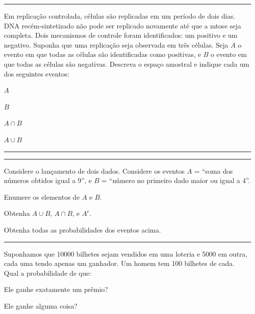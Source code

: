 \documentclass[a4paper,11pt,fleqn]{article}\usepackage[]{graphicx}\usepackage[]{color}
\theoremstyle{definition}
\begin{document}
\begin{compactenum}
\vspace{0.3cm}
\hrule
\vspace{0.3cm}

\item Em replicação controlada, células são replicadas em um período de
  dois dias. DNA recém-sintetizado não pode ser replicado novamente até
  que a mtose seja completa. Dois mecanismos de controle foram
  identificados: um positivo e um negativo. Suponha que uma replicação
  seja observada em três células. Seja $A$ o evento em que todas as
  células são identificadas como positivas, e $B$ o evento em que todas
  as células são negativas. Descreva o espaço amostral e indique cada um
  dos seguintes eventos: \\
  \begin{inparaenum}
  \item $A$ \,
  \item $B$ \,
  \item $A \cap B$ \,
  \item $A \cup B$
  \end{inparaenum}

\vspace{0.3cm}
\hrule
\vspace{0.3cm}

\clearpage

\vspace{0.3cm}
\hrule
\vspace{0.3cm}

\item Considere o lançamento de dois dados. Considere os eventos $A$ =
  ``soma dos números obtidos igual a 9'', e $B$ = ``número no primeiro
  dado maior ou igual a 4''.
  \begin{compactenum}
  \item Enumere os elementos de $A$ e $B$.
  \item Obtenha $A \cup B$, $A \cap B$, e $A^{c}$.
  \item Obtenha todas as probabilidades dos eventos acima.
  \end{compactenum}

\vspace{0.3cm}
\hrule
\vspace{0.3cm}

\item Suponhamos que 10000 bilhetes sejam vendidos em uma loteria e 5000
  em outra, cada uma tendo apenas um ganhador. Um homem tem 100 bilhetes
  de cada. Qual a probabilidade de que:
  \begin{compactenum}
  \item Ele ganhe exatamente um prêmio?
  \item Ele ganhe alguma coisa?
  \end{compactenum}


\end{compactenum}
\end{document}
